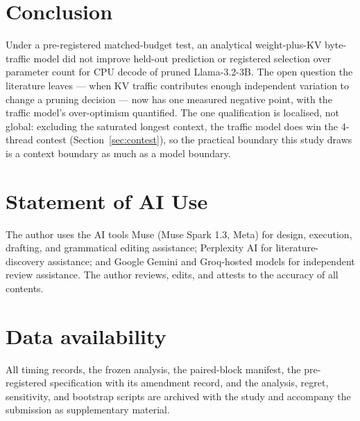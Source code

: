 \documentclass[11pt]{article}
\begin{document}
\section{Conclusion}
Under a pre-registered matched-budget test, an analytical
weight-plus-KV byte-traffic model did not improve held-out
prediction or registered selection over parameter count for CPU
decode of pruned Llama-3.2-3B. The open question the literature
leaves --- when KV traffic contributes enough independent
variation to change a pruning decision --- now has one measured
negative point, with the traffic model's over-optimism quantified.
The one qualification is localised, not global: excluding the
saturated longest context, the traffic model does win the
4-thread contest (Section~\ref{sec:contest}), so the practical
boundary this study draws is a context boundary as much as a
model boundary.

\section*{Statement of AI Use}
The author uses the AI tools Muse (Muse Spark 1.3, Meta) for
design, execution, drafting, and grammatical editing assistance;
Perplexity AI for literature-discovery assistance; and Google
Gemini and Groq-hosted models for independent review assistance.
The author reviews, edits, and attests to the accuracy of all
contents.

\section*{Data availability}
All timing records, the frozen analysis, the paired-block
manifest, the pre-registered specification with its amendment
record, and the analysis, regret, sensitivity, and bootstrap
scripts are
archived with the study and accompany the submission as
supplementary material.
\end{document}
